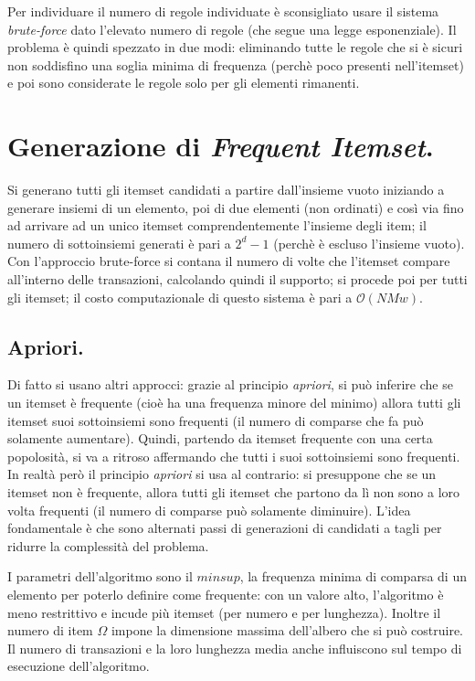 \documentclass[11pt, a4page, twocolumn]{article}
\begin{document}
Per individuare il numero di regole individuate è sconsigliato usare il sistema \textit{brute-force} dato l'elevato numero di regole (che segue una legge esponenziale).
Il problema è quindi spezzato in due modi: eliminando tutte le regole che si è sicuri non soddisfino una soglia minima di frequenza (perchè poco presenti nell'itemset) e poi sono considerate le regole solo per gli elementi rimanenti.

\section{Generazione di \textit{Frequent Itemset}.}
Si generano tutti gli itemset candidati a partire dall'insieme vuoto iniziando a generare insiemi di un elemento, poi di due elementi (non ordinati) e così via fino ad arrivare ad un unico itemset comprendentemente l'insieme degli item; il numero di sottoinsiemi generati è pari a $2^d - 1$ (perchè è escluso l'insieme vuoto).
Con l'approccio brute-force si contana il numero di volte che l'itemset compare all'interno delle transazioni, calcolando quindi il supporto; si procede poi per tutti gli itemset; il costo computazionale di questo sistema è pari a $\mathcal{O}(NMw)$.

\subsection{Apriori.}
Di fatto si usano altri approcci: grazie al principio \textit{apriori}, si può inferire che se un itemset è frequente (cioè ha una frequenza minore del minimo) allora tutti gli itemset suoi sottoinsiemi sono frequenti (il numero di comparse che fa può solamente aumentare).
Quindi, partendo da itemset frequente con una certa popolosità, si va a ritroso affermando che tutti i suoi sottoinsiemi sono frequenti.
In realtà però il principio \textit{apriori} si usa al contrario: si presuppone che se un itemset non è frequente, allora tutti gli itemset che partono da lì non sono a loro volta frequenti (il numero di comparse può solamente diminuire).
L'idea fondamentale è che sono alternati passi di generazioni di candidati a tagli per ridurre la complessità del problema.

I parametri dell'algoritmo sono il $minsup$, la frequenza minima di comparsa di un elemento per poterlo definire come frequente: con un valore alto, l'algoritmo è meno restrittivo e incude più itemset (per numero e per lunghezza).
Inoltre il numero di item $\Omega$ impone la dimensione massima dell'albero che si può costruire.
Il numero di transazioni e la loro lunghezza media anche influiscono sul tempo di esecuzione dell'algoritmo.
\end{document}
